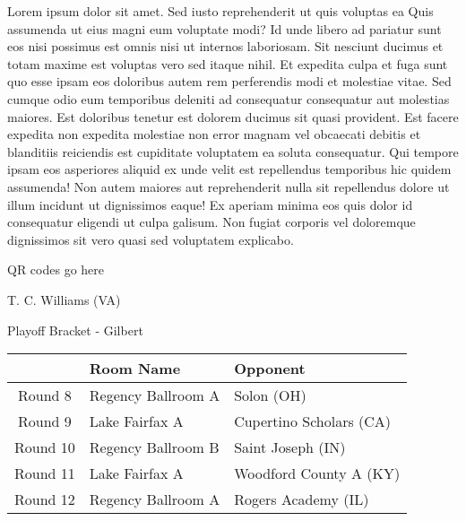 \documentclass{article}%
\begin{document}
\vspace*{8pt}%
\linebreak%
\newline%
\newline%
Lorem ipsum dolor sit amet. Sed iusto reprehenderit ut quis voluptas ea Quis assumenda ut eius magni eum voluptate modi? Id unde libero ad pariatur sunt eos nisi possimus est omnis nisi ut internos laboriosam. Sit nesciunt ducimus et totam maxime est voluptas vero sed itaque nihil. Et expedita culpa et fuga sunt quo esse ipsam eos doloribus autem rem perferendis modi et molestiae vitae.\newline%
\newline%
Sed cumque odio eum temporibus deleniti ad consequatur consequatur aut molestias maiores. Est doloribus tenetur est dolorem ducimus sit quasi provident. Est facere expedita non expedita molestiae non error magnam vel obcaecati debitis et blanditiis reiciendis est cupiditate voluptatem ea soluta consequatur. Qui tempore ipsam eos asperiores aliquid ex unde velit est repellendus temporibus hic quidem assumenda!\newline%
\newline%
Non autem maiores aut reprehenderit nulla sit repellendus dolore ut illum incidunt ut dignissimos eaque! Ex aperiam minima eos quis dolor id consequatur eligendi ut culpa galisum. Non fugiat corporis vel doloremque dignissimos sit vero quasi sed voluptatem explicabo.\newline%
\newline%
%
\vspace*{30pt}%
\begin{center}%
\begin{Huge}%
QR codes go here%
\end{Huge}%
\end{center}%
\newpage%
\begin{center}%
\begin{Huge}%
T. C. Williams (VA)%
\end{Huge}%
\vspace*{8pt}%
\linebreak%
\begin{Large}%
Playoff Bracket {-} Gilbert%
\end{Large}%
\end{center}%
%
\begin{tabularx}{\textwidth}{|c|Y|Y|}%
\hline%
&Room Name&Opponent\\%
\hline%
Round 8&Regency Ballroom A&Solon (OH)\\%
Round 9&Lake Fairfax A&Cupertino Scholars (CA)\\%
Round 10&Regency Ballroom B&Saint Joseph (IN)\\%
Round 11&Lake Fairfax A&Woodford County A (KY)\\%
Round 12&Regency Ballroom A&Rogers Academy (IL)\\%
\hline%
\end{tabularx}%
\end{document}
